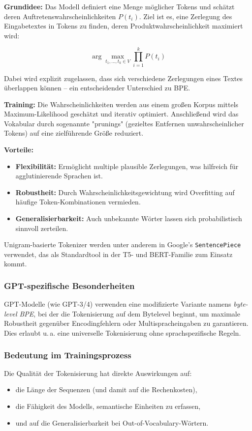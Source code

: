 \textbf{Grundidee:}
Das Modell definiert eine Menge möglicher Tokens und schätzt deren Auftretenswahrscheinlichkeiten $P(t_i)$. Ziel ist es, eine Zerlegung des Eingabetextes in Tokens zu finden, deren Produktwahrscheinlichkeit maximiert wird:

\[
\arg\max_{t_1,...,t_k \in V} \prod_{i=1}^k P(t_i)
\]

Dabei wird explizit zugelassen, dass sich verschiedene Zerlegungen eines Textes überlappen können – ein entscheidender Unterschied zu BPE.

\textbf{Training:}
Die Wahrscheinlichkeiten werden aus einem großen Korpus mittels Maximum-Likelihood geschätzt und iterativ optimiert. Anschließend wird das Vokabular durch sogenannte "prunings" (gezieltes Entfernen unwahrscheinlicher Tokens) auf eine zielführende Größe reduziert.

\textbf{Vorteile:}
\begin{itemize}
  \item \textbf{Flexibilität:} Ermöglicht multiple plausible Zerlegungen, was hilfreich für agglutinierende Sprachen ist.
  \item \textbf{Robustheit:} Durch Wahrscheinlichkeitsgewichtung wird Overfitting auf häufige Token-Kombinationen vermieden.
  \item \textbf{Generalisierbarkeit:} Auch unbekannte Wörter lassen sich probabilistisch sinnvoll zerteilen.
\end{itemize}

Unigram-basierte Tokenizer werden unter anderem in Google’s \texttt{SentencePiece} verwendet, das als Standardtool in der T5- und BERT-Familie zum Einsatz kommt.

\subsubsection{GPT-spezifische Besonderheiten}

GPT-Modelle (wie GPT-3/4) verwenden eine modifizierte Variante namens \textit{byte-level BPE}, bei der die Tokenisierung auf dem Bytelevel beginnt, um maximale Robustheit gegenüber Encodingfehlern oder Multispracheingaben zu garantieren. Dies erlaubt u. a. eine universelle Tokenisierung ohne sprachspezifische Regeln.

\subsubsection{Bedeutung im Trainingsprozess}

Die Qualität der Tokenisierung hat direkte Auswirkungen auf:
\begin{itemize}
  \item die Länge der Sequenzen (und damit auf die Rechenkosten),
  \item die Fähigkeit des Modells, semantische Einheiten zu erfassen,
  \item und auf die Generalisierbarkeit bei Out-of-Vocabulary-Wörtern.
\end{itemize}

